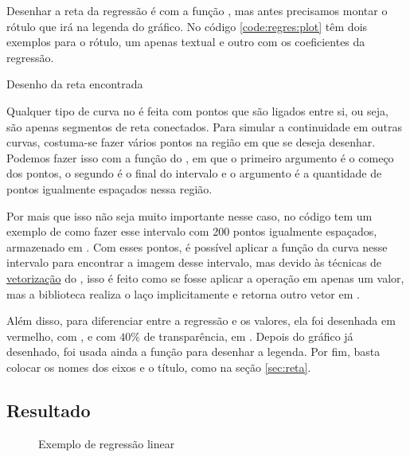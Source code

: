     Desenhar a reta da regressão é com a função , mas antes precisamos montar o rótulo que irá na legenda do gráfico. No código \ref{code:regres:plot} têm dois exemplos para o rótulo, um apenas textual e outro com os coeficientes da regressão.

    \begin{listing}[H]
        \caption{Desenho da reta encontrada}
        \label{code:regres:plot}

    \end{listing}

    Qualquer tipo de curva no \matplotlib é feita com pontos que são ligados entre si, ou seja, são apenas segmentos de reta conectados. Para simular a continuidade em outras curvas, costuma-se fazer vários pontos na região em que se deseja desenhar. Podemos fazer isso com a função  do \numpy, em que o primeiro argumento é o começo dos pontos, o segundo é o final do intervalo e o argumento  é a quantidade de pontos igualmente espaçados nessa região.

    Por mais que isso não seja muito importante nesse caso, no código tem um exemplo de como fazer esse intervalo com 200 pontos igualmente espaçados, armazenado em . Com esses pontos, é possível aplicar a função da curva nesse intervalo para encontrar a imagem desse intervalo, mas devido às técnicas de \href{https://realpython.com/numpy-array-programming/\#what-is-vectorization}{vetorização} do \numpy, isso é feito como se fosse aplicar a operação em apenas um valor, mas a biblioteca realiza o laço implicitamente e retorna outro vetor em .

    Além disso, para diferenciar entre a regressão e os valores, ela foi desenhada em vermelho, com , e com $40\%$ de transparência, em . Depois do gráfico já desenhado, foi usada ainda a função  para desenhar a legenda. Por fim, basta colocar os nomes dos eixos e o título, como na seção \ref{sec:reta}.


\subsection{Resultado}

    \begin{figure}[H]
        \centering
        

        \caption{Exemplo de regressão linear}
        \label{fig:regres:resultado}
    \end{figure}
